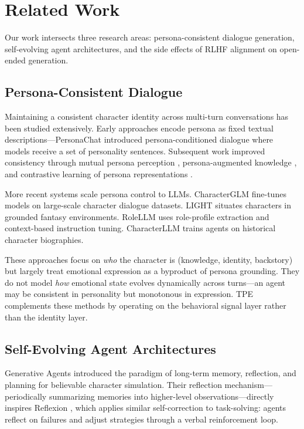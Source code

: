 \section{Related Work}

Our work intersects three research areas: persona-consistent dialogue generation, self-evolving agent architectures, and the side effects of RLHF alignment on open-ended generation.

\subsection{Persona-Consistent Dialogue}

Maintaining a consistent character identity across multi-turn conversations has been studied extensively. Early approaches encode persona as fixed textual descriptions---PersonaChat \cite{zhang2018personalizing} introduced persona-conditioned dialogue where models receive a set of personality sentences. Subsequent work improved consistency through mutual persona perception \cite{liu2020you}, persona-augmented knowledge \cite{majumder2020like}, and contrastive learning of persona representations \cite{cao2022model}.

More recent systems scale persona control to LLMs. CharacterGLM \cite{zhou2023characterglm} fine-tunes models on large-scale character dialogue datasets. LIGHT \cite{urbanek2019learning} situates characters in grounded fantasy environments. RoleLLM \cite{wang2023rolellm} uses role-profile extraction and context-based instruction tuning. CharacterLLM \cite{shao2023character} trains agents on historical character biographies.

These approaches focus on \emph{who} the character is (knowledge, identity, backstory) but largely treat emotional expression as a byproduct of persona grounding. They do not model \emph{how} emotional state evolves dynamically across turns---an agent may be consistent in personality but monotonous in expression. TPE complements these methods by operating on the behavioral signal layer rather than the identity layer.

\subsection{Self-Evolving Agent Architectures}

Generative Agents \cite{park2023generative} introduced the paradigm of long-term memory, reflection, and planning for believable character simulation. Their reflection mechanism---periodically summarizing memories into higher-level observations---directly inspires Reflexion \cite{shinn2023reflexion}, which applies similar self-correction to task-solving: agents reflect on failures and adjust strategies through a verbal reinforcement loop.

